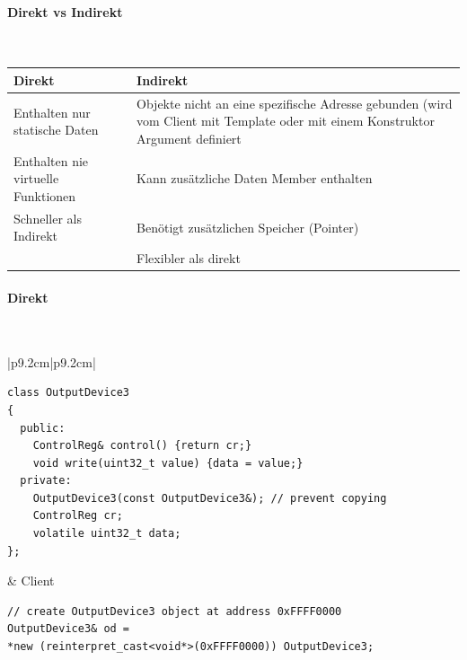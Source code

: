 \paragraph{Direkt vs Indirekt}~
\\
\vspace{0.5cm}
\begin{tabular}{|p{9.2cm}|p{9.2cm}|}
    \hline
    Direkt   &   Indirekt\\
    \hline \hline
    Enthalten nur statische Daten & Objekte nicht an eine spezifische Adresse gebunden (wird vom Client mit Template oder mit einem Konstruktor Argument definiert\\
    Enthalten nie virtuelle Funktionen & Kann zusätzliche Daten Member enthalten\\
    Schneller als Indirekt& Benötigt zusätzlichen Speicher (Pointer)\\
    & Flexibler als direkt\\
    \hline
\end{tabular}



\paragraph{Direkt}~
\\
\begin{tabular}{|p{9.2cm}|p{9.2cm}|}

\begin{lstlisting}
class OutputDevice3
{
  public:
    ControlReg& control() {return cr;}
    void write(uint32_t value) {data = value;}
  private:
    OutputDevice3(const OutputDevice3&); // prevent copying
    ControlReg cr;
    volatile uint32_t data;
};
\end{lstlisting}
&
Client
\begin{lstlisting}
// create OutputDevice3 object at address 0xFFFF0000
OutputDevice3& od =
*new (reinterpret_cast<void*>(0xFFFF0000)) OutputDevice3;
\end{lstlisting}
\end{tabular}

